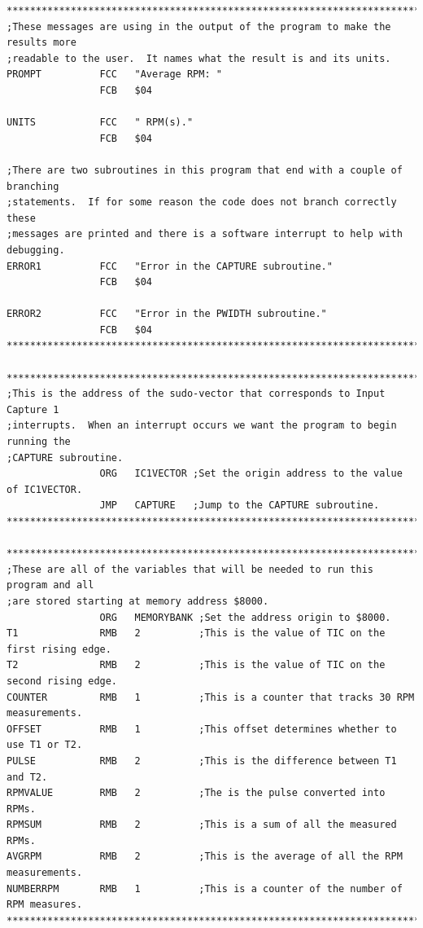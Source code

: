 \documentclass[12pt]{report}
\begin{document}
\begin{Verbatim}[frame=single, fontsize=\footnotesize]
****************************************************************************************
;These messages are using in the output of the program to make the results more
;readable to the user.  It names what the result is and its units.
PROMPT          FCC   "Average RPM: "
                FCB   $04
                
UNITS           FCC   " RPM(s)."
                FCB   $04
                
;There are two subroutines in this program that end with a couple of branching
;statements.  If for some reason the code does not branch correctly these
;messages are printed and there is a software interrupt to help with debugging.
ERROR1          FCC   "Error in the CAPTURE subroutine."
                FCB   $04
                
ERROR2          FCC   "Error in the PWIDTH subroutine."
                FCB   $04
****************************************************************************************

****************************************************************************************
;This is the address of the sudo-vector that corresponds to Input Capture 1
;interrupts.  When an interrupt occurs we want the program to begin running the
;CAPTURE subroutine.
                ORG   IC1VECTOR ;Set the origin address to the value of IC1VECTOR.
                JMP   CAPTURE   ;Jump to the CAPTURE subroutine.
****************************************************************************************

****************************************************************************************
;These are all of the variables that will be needed to run this program and all
;are stored starting at memory address $8000.
                ORG   MEMORYBANK ;Set the address origin to $8000.
T1              RMB   2          ;This is the value of TIC on the first rising edge.
T2              RMB   2          ;This is the value of TIC on the second rising edge.
COUNTER         RMB   1          ;This is a counter that tracks 30 RPM measurements.
OFFSET          RMB   1          ;This offset determines whether to use T1 or T2.
PULSE           RMB   2          ;This is the difference between T1 and T2.
RPMVALUE        RMB   2          ;The is the pulse converted into RPMs.
RPMSUM          RMB   2          ;This is a sum of all the measured RPMs.
AVGRPM          RMB   2          ;This is the average of all the RPM measurements.
NUMBERRPM       RMB   1          ;This is a counter of the number of RPM measures.
****************************************************************************************


\end{Verbatim}
\end{document}
